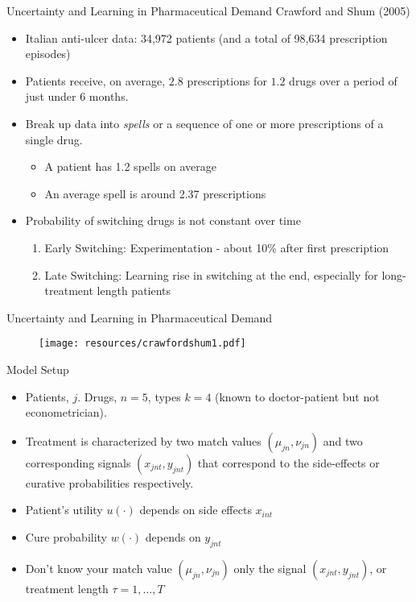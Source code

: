 \begin{frame}{Uncertainty and Learning in Pharmaceutical Demand}
Crawford and Shum (2005)
\begin{itemize}
\item  Italian anti-ulcer data: 34,972 patients (and a total of 98,634 prescription episodes)
\item Patients receive, on average, $2.8$ prescriptions for $1.2$ drugs over a period of just under 6 months.
\item Break up data into \textit{spells} or a sequence of one or more prescriptions of a single drug.
\begin{itemize}
\item A patient has 1.2 spells on average
\item An average spell is around 2.37 prescriptions
\end{itemize}
\item Probability of switching drugs is not constant over time
\begin{enumerate}
\item Early Switching: \alert{Experimentation} - about 10\% after first prescription
\item Late Switching: \alert{Learning} rise in switching at the end, especially for long-treatment length patients
\end{enumerate}
\end{itemize}
\end{frame}


\begin{frame}{Uncertainty and Learning in Pharmaceutical Demand}
\begin{figure}[htbp]
\begin{center}
\texttt{[image: resources/crawfordshum1.pdf]}
\label{default}
\end{center}
\end{figure}
\end{frame}

\begin{frame}{Model Setup}
\begin{itemize}
\item Patients, $j$. Drugs, $n=5$, types $k=4$ (known to doctor-patient but not econometrician).
\item Treatment is characterized by two match values $(\mu_{jn},\nu_{jn})$ and two corresponding signals $(x_{jnt},y_{jnt})$ that correspond to the side-effects or curative probabilities respectively.
\item Patient's utility $u(\cdot)$ depends on side effects $x_{int}$
\item Cure probability $w(\cdot)$ depends on $y_{jnt}$
\item Don't know your match value  $(\mu_{jn},\nu_{jn})$  only the signal $(x_{jnt},y_{jnt})$, or treatment length $\tau = 1,\ldots,T$
\end{itemize}
\end{frame}


